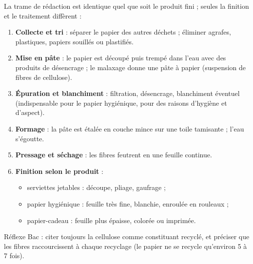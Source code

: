 \documentclass[11pt]{article}
\newcommand{\cle}[1]{{\popxbold\color{popdark}#1}}
\begin{document}
\begin{methode}
La trame de rédaction est identique quel que soit le produit fini ; seules la finition et le traitement diffèrent :
\begin{enumerate}
\item \textbf{Collecte et tri} : séparer le papier des autres déchets ; éliminer agrafes, plastiques, papiers souillés ou plastifiés.
\item \textbf{Mise en pâte} : le papier est découpé puis trempé dans l'eau avec des produits de désencrage ; le malaxage donne une \cle{pâte à papier} (suspension de fibres de cellulose).
\item \textbf{Épuration et blanchiment} : filtration, désencrage, blanchiment éventuel (indispensable pour le papier hygiénique, pour des raisons d'hygiène et d'aspect).
\item \textbf{Formage} : la pâte est étalée en couche mince sur une toile tamisante ; l'eau s'égoutte.
\item \textbf{Pressage et séchage} : les fibres feutrent en une feuille continue.
\item \textbf{Finition selon le produit} :
\begin{itemize}
\item serviettes jetables : découpe, pliage, gaufrage ;
\item papier hygiénique : feuille très fine, blanchie, enroulée en rouleaux ;
\item papier-cadeau : feuille plus épaisse, colorée ou imprimée.
\end{itemize}
\end{enumerate}
Réflexe Bac : citer toujours la \cle{cellulose} comme constituant recyclé, et préciser que les fibres raccourcissent à chaque recyclage (le papier ne se recycle qu'environ 5 à 7 fois).
\end{methode}
\end{document}
